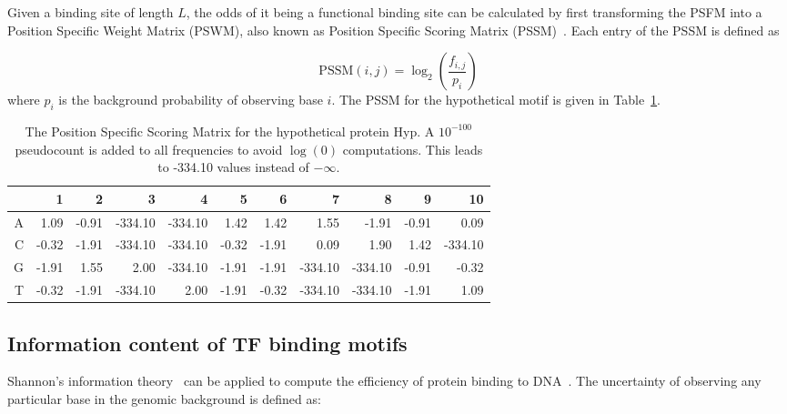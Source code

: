 Given a binding site of length $L$, the odds of it being a functional binding
site can be calculated by first transforming the PSFM into a Position Specific
Weight Matrix (PSWM), also known as Position Specific Scoring Matrix
(PSSM)~\citep{stormo2000dna}. Each entry of the PSSM is defined as

\begin{equation}
  \label{eq:pssm}
  \mathrm{PSSM}(i, j) = \log_2\left(\frac{f_{i, j}}{p_i}\right)
\end{equation}
where $p_i$ is the background probability of observing base $i$. The PSSM for
the hypothetical motif is given in Table~\ref{tab:pssm}.

\begin{table}
  \centering
  \caption[The Position Specific Scoring Matrix for the hypothetical
  protein.]{The Position Specific Scoring Matrix for the hypothetical protein
    Hyp. A $10^{-100}$ pseudocount is added to all frequencies to avoid
    $\log(0)$ computations. This leads to -334.10 values
    instead of $-\infty$.}
  \label{tab:pssm}
\setlength\tabcolsep{3.5pt} %
  \begin{tabular}{|r|r|r|r|r|r|r|r|r|r|r|}

\hline
  &     1 &   2 &    3 &    4 &    5 &    6 &    7 &    8 &    9 & 10\\
\hline
A &  1.09 & -0.91 & -334.10 & -334.10 &  1.42 &  1.42 &  1.55   & -1.91 & -0.91&   0.09\\
\hline
C & -0.32 & -1.91 & -334.10 & -334.10 & -0.32 & -1.91 &  0.09   & 1.90  & 1.42 & -334.10\\
\hline
G & -1.91 &  1.55 &  2.00   & -334.10 & -1.91 & -1.91 & -334.10 & -334.10 &  -0.91 & -0.32\\
\hline
T & -0.32 & -1.91 & -334.10 &  2.00   & -1.91 & -0.32 & -334.10 & -334.10 &  -1.91 &  1.09\\
\hline
  \end{tabular}
\end{table}

\subsection{Information content of TF binding motifs}

Shannon’s information theory~\citep{shannon1948mathematical} can be applied to
compute the efficiency of protein binding to DNA~\citep{schneider2010brief}.
The uncertainty of observing any particular base in the genomic background is
defined as:

